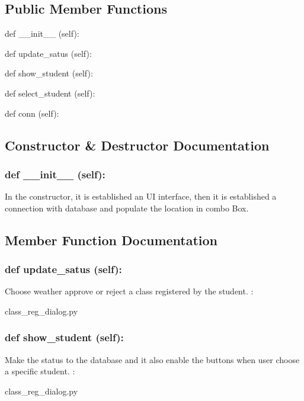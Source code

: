 \subsection*{Public Member Functions}
\begin{DoxyCompactItemize}
\item 
def {\_\_init\_\_} (self):
\item 
def {update\_satus} (self):
\item 
def {show\_student} (self):
\item 
def {select\_student} (self):
\item 
def {conn} (self):
\end{DoxyCompactItemize}

\subsection{Constructor \& Destructor Documentation}
\hypertarget{class_poly_aa3def076b74bed67904976ad4f9fe9b1}{
\subsubsection[{def __init__ (self):}]{\setlength{\rightskip}{0pt plus 5cm}def {\_\_init\_\_} (self): 
}}
In the constructor, it is established an UI interface, then it is  established a connection with database and populate the location in combo Box.
 

\subsection{Member Function Documentation}
\hypertarget{class_poly_a14a7ad77ce612b0c54f531d307ee4b39}{
\subsubsection[{def update_satus (self):}]{\setlength{\rightskip}{0pt plus 5cm}def {update\_satus} (self):}}\label{class_poly_a14a7ad77ce612b0c54f531d307ee4b39}
Choose weather approve or reject a class registered by the student.
:\begin{DoxyCompactItemize}
\item 
class\_reg\_dialog.\-py\end{DoxyCompactItemize}

\hypertarget{class_poly_a14a7ad77ce612b0c54f531d307ee4b39}{
\subsubsection[{def show_student (self):}]{\setlength{\rightskip}{0pt plus 5cm}def {show\_student} (self):}}\label{class_poly_a14a7ad77ce612b0c54f531d307ee4b39}
Make the status to the database and it also enable the buttons when user choose a specific student.
:\begin{DoxyCompactItemize}
\item 
class\_reg\_dialog.\-py\end{DoxyCompactItemize}

